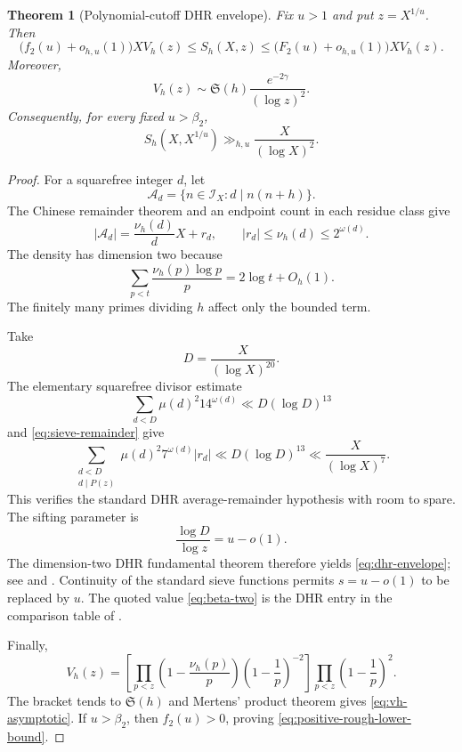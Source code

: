 \documentclass[11pt]{article}
\newtheorem{theorem}{Theorem}[section]
\theoremstyle{definition}
\theoremstyle{remark}
\newcommand{\cA}{\mathcal A}
\newcommand{\cI}{\mathcal I}
\begin{document}
\begin{theorem}[Polynomial-cutoff DHR envelope]\label{thm:dhr-envelope}
Fix $u>1$ and put $z=X^{1/u}$.  Then
\begin{equation}\label{eq:dhr-envelope}
 \bigl(f_2(u)+o_{h,u}(1)\bigr)X V_h(z)
 \le S_h(X,z)
 \le\bigl(F_2(u)+o_{h,u}(1)\bigr)X V_h(z).
\end{equation}
Moreover,
\begin{equation}\label{eq:vh-asymptotic}
 V_h(z)\sim
 \mathfrak S(h)\frac{e^{-2\gamma}}{(\log z)^2}.
\end{equation}
Consequently, for every fixed $u>\beta_2$,
\begin{equation}\label{eq:positive-rough-lower-bound}
 S_h(X,X^{1/u})\gg_{h,u}\frac{X}{(\log X)^2}.
\end{equation}
\end{theorem}

\begin{proof}
For a squarefree integer $d$, let
\[
 \cA_d=\{n\in\cI_X:d\mid n(n+h)\}.
\]
The Chinese remainder theorem and an endpoint count in each residue class give
\begin{equation}\label{eq:sieve-remainder}
 |\cA_d|=\frac{\nu_h(d)}dX+r_d,
 \qquad |r_d|\le\nu_h(d)\le2^{\omega(d)}.
\end{equation}
The density has dimension two because
\begin{equation}\label{eq:sieve-dimension}
 \sum_{p<t}\frac{\nu_h(p)\log p}{p}
 =2\log t+O_h(1).
\end{equation}
The finitely many primes dividing $h$ affect only the bounded term.

Take
\begin{equation}\label{eq:sieve-level}
 D=\frac{X}{(\log X)^{20}}.
\end{equation}
The elementary squarefree divisor estimate
\[
 \sum_{d<D}\mu(d)^2 14^{\omega(d)}\ll D(\log D)^{13}
\]
and \eqref{eq:sieve-remainder} give
\[
 \sum_{\substack{d<D\\d\mid P(z)}}
 \mu(d)^2 7^{\omega(d)}|r_d|
 \ll D(\log D)^{13}
 \ll \frac{X}{(\log X)^7}.
\]
This verifies the standard DHR average-remainder hypothesis with room to spare.  The sifting parameter is
\begin{equation}\label{eq:sifting-parameter}
 \frac{\log D}{\log z}=u-o(1).
\end{equation}
The dimension-two DHR fundamental theorem therefore yields \eqref{eq:dhr-envelope}; see \citet[Chapter~9, especially Theorem~9.1]{DiamondHalberstam2008} and \citet{DiamondHalberstamRichert1988}.  Continuity of the standard sieve functions permits $s=u-o(1)$ to be replaced by $u$.  The quoted value \eqref{eq:beta-two} is the DHR entry in the comparison table of \citet{Franze2011}.

Finally,
\[
 V_h(z)=
 \left[\prod_{p<z}
  \left(1-\frac{\nu_h(p)}p\right)
  \left(1-\frac1p\right)^{-2}\right]
 \prod_{p<z}\left(1-\frac1p\right)^2.
\]
The bracket tends to $\mathfrak S(h)$ and Mertens' product theorem gives \eqref{eq:vh-asymptotic}.  If $u>\beta_2$, then $f_2(u)>0$, proving \eqref{eq:positive-rough-lower-bound}.
\end{proof}
\end{document}

